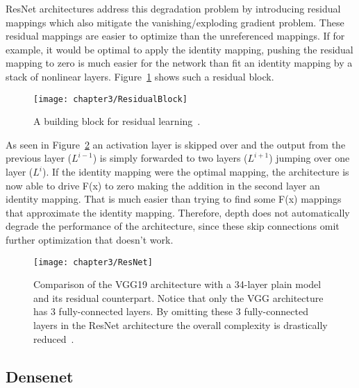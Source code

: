 ResNet architectures address this degradation problem by introducing residual mappings which also mitigate the vanishing/exploding gradient problem. These residual mappings are easier to optimize than the unreferenced mappings. If for example, it would be optimal to apply the identity mapping, pushing the residual mapping to zero is much easier for the network than fit an identity mapping by a stack of nonlinear layers. Figure~\ref{fig:ResidualBlock} shows such a residual block.\\


\begin{figure}[!h]
  \centering
  \caption{A building block for residual learning~\cite{he2016deep}.}
  \texttt{[image: chapter3/ResidualBlock]}
  \label{fig:ResidualBlock}
\end{figure}

\quad

As seen in Figure~\ref{fig:ResNet} an activation layer is skipped over and the output from the previous layer ($L^{i-1}$) is simply forwarded to two layers ($L^{i+1}$) jumping over one layer ($L^{i}$). If the identity mapping were the optimal mapping, the architecture is now able to drive F(x) to zero making the addition in the second layer an identity mapping. That is much easier than trying to find some F(x) mappings that approximate the identity mapping. Therefore, depth does not automatically degrade the performance of the architecture, since these skip connections omit further optimization that doesn't work.\\


\begin{figure}[!h]
  \centering
  \caption{Comparison of the VGG19 architecture with a 34-layer plain model and its residual counterpart. Notice that only the VGG architecture has 3 fully-connected layers. By omitting these 3 fully-connected layers in the ResNet architecture the overall complexity is drastically reduced~\cite{he2016deep}.}
  \texttt{[image: chapter3/ResNet]}
  \label{fig:ResNet}
\end{figure}

\subsection{Densenet}

